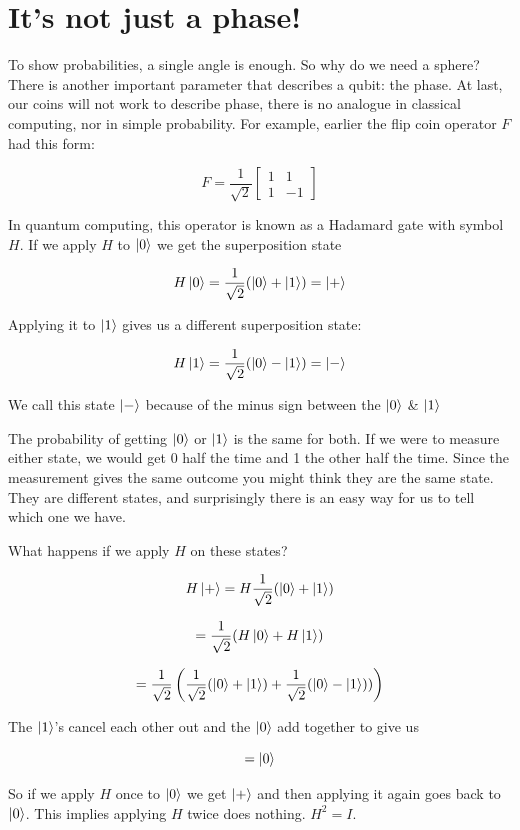 \section{It's not just a phase!} \label{It's not just a phase!}

To show probabilities, a single angle is enough. So why do we need a sphere? There is another important parameter that describes a qubit: the phase. At last, our coins will not work to describe phase, there is no analogue in classical computing, nor in simple probability. For example, earlier the flip coin operator $F$ had this form:

$$
F =  \frac{1}{\sqrt{2}} \begin{bmatrix} 1 & 1 \\ 1 & -1 \end{bmatrix}
$$

In quantum computing, this operator is known as a Hadamard gate with symbol $H$. 
If we apply $H$ to $\ket{0}$ we get the superposition state 

$$
H\ket{0} = \frac{1}{\sqrt{2}} ( \ket{0} + \ket{1}) = \ket{+}
$$

Applying it to $\ket{1}$ gives us a different superposition state: 

$$
H\ket{1} = \frac{1}{\sqrt{2}} ( \ket{0} - \ket{1}) = \ket{-}
$$

We call this state $\ket{-}$ because of the minus sign between the $\ket{0}$ \& $\ket{1}$

The probability of getting $\ket{0}$ or $\ket{1}$ is the same for both. If we were to measure either state, we would get 0 half the time and 1 the other half the time. Since the measurement gives the same outcome you might think they are the same state. They are different states, and surprisingly there is an easy way for us to tell which one we have. 

What happens if we apply $H$ on these states? 

$$ H\ket{+} = H \frac{1}{\sqrt{2}} ( \ket{0} + \ket{1})$$

$$= \frac{1}{\sqrt{2}} (H\ket{0} + H\ket{1})$$

$$ = \frac{1}{\sqrt{2}}\left( \frac{1}{\sqrt{2}}(\ket{0} + \ket{1})+\frac{1}{\sqrt{2}}(\ket{0} - \ket{1}))  \right)$$

The $\ket{1}$'s cancel each other out and the $\ket{0}$ add together to give us

$$ = \ket{0} $$

So if we apply $H$ once to $\ket{0}$ we get $\ket{+}$ and then applying it again goes back to $\ket{0}$. This implies applying $H$ twice does nothing. $H^2 = I$.

